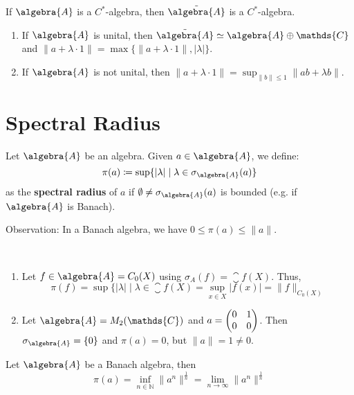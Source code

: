 \documentclass[a4paper]{article}
\begin{document}
\begin{remark}
	If $\algebra{A}$ is a $C^*$-algebra, then $\tilde{\algebra{A}}$ is a $C^*$-algebra.
	\begin{enumerate}
		\item If $ \algebra{A}$ is unital, then $\tilde{\algebra{A}} \simeq \algebra{A} \oplus \mathds{C}$ and $\|a + \lambda \cdot 1\| = \max\{\|a + \lambda \cdot 1\|, |\lambda|\}$.
		\item If $\algebra{A}$ is not unital, then $\|a + \lambda \cdot 1\| = \sup_{\|b\| \leq 1} \|ab + \lambda b\|$.
	\end{enumerate}
\end{remark}

\section{Spectral Radius}

\begin{definition}
	Let $\algebra{A}$ be an algebra. Given $a \in \algebra{A}$, we define:
	\begin{equation*}
		\pi(a) \coloneq \sup \{ |\lambda| \mid \lambda \in \sigma_\algebra{A}(a) \}
	\end{equation*}
	as the \textbf{spectral radius} of $a$ if $\emptyset \neq \sigma_\algebra{A}(a)$ is bounded (e.g. if $\algebra{A}$ is Banach).
\end{definition}

Observation: In a Banach algebra, we have $0 \leq \pi(a) \leq \|a\|$.

\begin{example}~
	\begin{enumerate}
		\item Let $f \in \algebra{A} = C_0(X)$ using $\sigma_A(f) = \closure{f(X)}$. Thus,
		\begin{equation*}
			\pi(f) = \sup \{ |\lambda| \mid \lambda \in \closure{f(X)} = \sup_{x \in X} |f(x)| = \|f\|_{C_0(X)}
 		\end{equation*}
		\item Let $\algebra{A} = M_2(\mathds{C})$ and $a = \left(\begin{matrix}0 & 1 \\ 0 & 0\end{matrix}\right)$. Then $\sigma_\algebra{A} = \{0\}$ and $\pi(a) = 0$, but $\|a\| = 1 \neq 0$.
	\end{enumerate}
\end{example}

\begin{theorem}
	Let $\algebra{A}$ be a Banach algebra, then
	\begin{equation*}
		\pi(a) = \inf_{n \in \mathds{N}} \|a^n\|^{\frac{1}{n}} = \lim_{n \to \infty} \|a^n\|^{\frac{1}{n}}
	\end{equation*}
\end{theorem}
\end{document}
